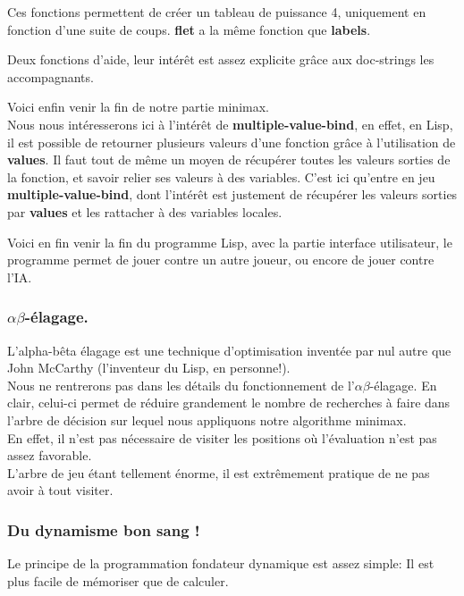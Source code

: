 \documentclass[a4paper, 12pt]{article}
\newcommand{\connect}[1]{
  
}
\numberwithin{equation}{subsection}
\begin{document}
\connect{259-275}
Ces fonctions permettent de créer un tableau de puissance 4, uniquement en fonction d'une suite de coups. {\bf flet} a la même fonction que {\bf labels}.

\connect{277-283}
Deux fonctions d'aide, leur intérêt est assez explicite grâce aux doc-strings les accompagnants.

\connect{291-327}
Voici enfin venir la fin de notre partie minimax. \\

Nous nous intéresserons ici à l'intérêt de {\bf multiple-value-bind}, en effet, en Lisp, il est possible de retourner plusieurs valeurs d'une fonction grâce à l'utilisation de {\bf values}. Il faut tout de même un moyen de récupérer toutes les valeurs sorties de la fonction, et savoir relier ses valeurs à des variables. C'est ici qu'entre en jeu {\bf multiple-value-bind}, dont l'intérêt est justement de récupérer les valeurs sorties par {\bf values} et les rattacher à des variables locales.

\connect{329-363}
Voici en fin venir la fin du programme Lisp, avec la partie interface utilisateur, le programme permet de jouer contre un autre joueur, ou encore de jouer contre l'IA. \\
\subsubsection{$\alpha\beta$-élagage.}
L'alpha-bêta élagage est une technique d'optimisation inventée par nul autre que John McCarthy (l'inventeur du Lisp, en personne!).\\

Nous ne rentrerons pas dans les détails du fonctionnement de l'$\alpha\beta$-élagage. En clair, celui-ci permet de réduire grandement le nombre de recherches à faire dans l'arbre de décision sur lequel nous appliquons notre algorithme minimax.\\

En effet, il n'est pas nécessaire de visiter les positions où l'évaluation n'est pas assez favorable.\\

L'arbre de jeu étant tellement énorme, il est extrêmement pratique de ne pas avoir à tout visiter.
\subsubsection{Du dynamisme bon sang !}
Le principe de la programmation fondateur dynamique est assez simple: Il est plus facile de mémoriser que de calculer.\\
\end{document}
